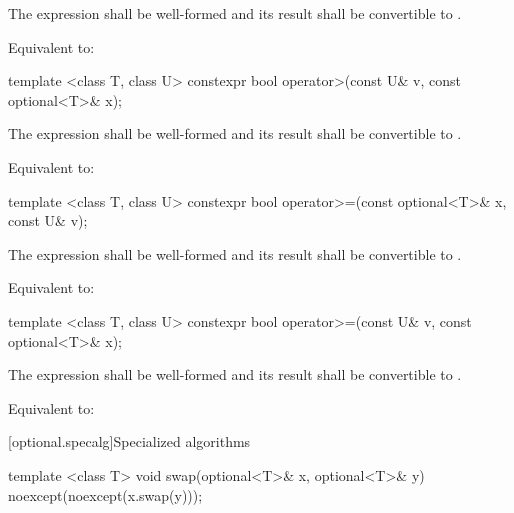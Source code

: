 \begin{itemdescr}
\pnum
\requires
The expression  shall be well-formed and
its result shall be convertible to .

\pnum
\effects
Equivalent to: 
\end{itemdescr}

%
\begin{itemdecl}
template <class T, class U> constexpr bool operator>(const U& v, const optional<T>& x);
\end{itemdecl}

\begin{itemdescr}
\pnum
\requires
The expression  shall be well-formed and
its result shall be convertible to .

\pnum
\effects
Equivalent to: 
\end{itemdescr}

%
\begin{itemdecl}
template <class T, class U> constexpr bool operator>=(const optional<T>& x, const U& v);
\end{itemdecl}

\begin{itemdescr}
\pnum
\requires
The expression  shall be well-formed and
its result shall be convertible to .

\pnum
\effects
Equivalent to: 
\end{itemdescr}

%
\begin{itemdecl}
template <class T, class U> constexpr bool operator>=(const U& v, const optional<T>& x);
\end{itemdecl}

\begin{itemdescr}
\pnum
\requires
The expression  shall be well-formed and
its result shall be convertible to .

\pnum
\effects
Equivalent to: 
\end{itemdescr}


[optional.specalg]{Specialized algorithms}

%
\begin{itemdecl}
template <class T> void swap(optional<T>& x, optional<T>& y) noexcept(noexcept(x.swap(y)));
\end{itemdecl}

